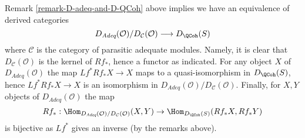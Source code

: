 \begin{remark}
\label{remark-conclusion}
Remark \ref{remark-D-adeq-and-D-QCoh}
above implies we have an equivalence of derived categories
$$
D_{\textit{Adeq}}(\mathcal{O})/D_\mathcal{C}(\mathcal{O})
\longrightarrow
D_\QCoh(S)
$$
where $\mathcal{C}$ is the category of parasitic adequate modules.
Namely, it is clear that $D_\mathcal{C}(\mathcal{O})$ is the kernel
of $Rf_*$, hence a functor as indicated. For any object $X$ of
$D_{\textit{Adeq}}(\mathcal{O})$ the map $Lf^*Rf_*X \to X$ maps
to a quasi-isomorphism in $D_\QCoh(S)$, hence
$Lf^*Rf_*X \to X$ is an isomorphism in
$D_{\textit{Adeq}}(\mathcal{O})/D_\mathcal{C}(\mathcal{O})$.
Finally, for $X, Y$ objects of $D_{\textit{Adeq}}(\mathcal{O})$
the map
$$
Rf_* :
\Hom_{D_{\textit{Adeq}}(\mathcal{O})/D_\mathcal{C}(\mathcal{O})}(X, Y)
\to
\Hom_{D_\QCoh(S)}(Rf_*X, Rf_*Y)
$$
is bijective as $Lf^*$ gives an inverse (by the remarks above).
\end{remark}















